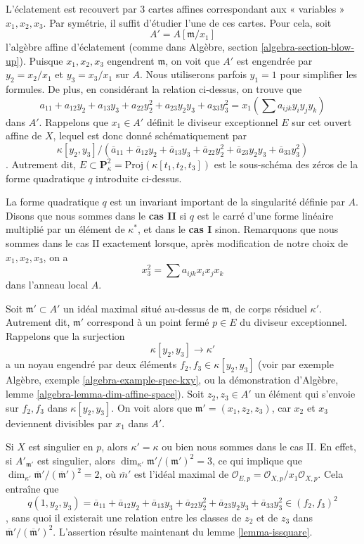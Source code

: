 \medskip\noindent L'éclatement est recouvert par $3$ cartes affines correspondant aux « variables » $x_1, x_2, x_3$. Par symétrie, il suffit d'étudier l'une de ces cartes. Pour cela, soit $$
A' = A[\mathfrak m/x_1]
$$ l'algèbre affine d'éclatement (comme dans Algèbre, section \ref{algebra-section-blow-up}). Puisque $x_1, x_2, x_3$ engendrent $\mathfrak m$, on voit que $A'$ est engendrée par $y_2 = x_2/x_1$ et $y_3 = x_3/x_1$ sur $A$. Nous utiliserons parfois $y_1 = 1$ pour simplifier les formules. De plus, en considérant la relation ci-dessus, on trouve que $$
a_{11} + a_{12} y_2 + a_{13} y_3 + a_{22} y_2^2 +
a_{23} y_2y_3 + a_{33} y_3^2 =
x_1 (\sum a_{ijk} y_iy_jy_k)
$$ dans $A'$. Rappelons que $x_1 \in A'$ définit le diviseur exceptionnel $E$ sur cet ouvert affine de $X$, lequel est donc donné schématiquement par $$
\kappa[y_2, y_3]/
(\overline{a}_{11} + \overline{a}_{12} y_2 + \overline{a}_{13} y_3 +
\overline{a}_{22} y_2^2 + \overline{a}_{23} y_2y_3 + \overline{a}_{33} y_3^2)
$$. Autrement dit, $E \subset \mathbf{P}^2_\kappa = \text{Proj}(\kappa[t_1, t_2, t_3])$ est le sous-schéma des zéros de la forme quadratique $q$ introduite ci-dessus.

\medskip\noindent La forme quadratique $q$ est un invariant important de la singularité définie par $A$. Disons que nous sommes dans le {\bf cas II} si $q$ est le carré d'une forme linéaire multiplié par un élément de $\kappa^*$, et dans le {\bf cas I} sinon. Remarquons que nous sommes dans le cas II exactement lorsque, après modification de notre choix de $x_1, x_2, x_3$, on a $$
x_3^2 = \sum a_{ijk}x_ix_jx_k
$$ dans l'anneau local $A$.

\medskip\noindent Soit $\mathfrak m' \subset A'$ un idéal maximal situé au-dessus de $\mathfrak m$, de corps résiduel $\kappa'$. Autrement dit, $\mathfrak m'$ correspond à un point fermé $p \in E$ du diviseur exceptionnel. Rappelons que la surjection $$
\kappa[y_2, y_3] \to \kappa'
$$ a un noyau engendré par deux éléments $f_2, f_3 \in \kappa[y_2, y_3]$ (voir par exemple Algèbre, exemple \ref{algebra-example-spec-kxy}, ou la démonstration d'Algèbre, lemme \ref{algebra-lemma-dim-affine-space}). Soit $z_2, z_3 \in A'$ un élément qui s'envoie sur $f_2, f_3$ dans $\kappa[y_2, y_3]$. On voit alors que $\mathfrak m' = (x_1, z_2, z_3)$, car $x_2$ et $x_3$ deviennent divisibles par $x_1$ dans $A'$.

\medskip{} Si $X$ est singulier en $p$, alors $\kappa' = \kappa$ ou bien nous sommes dans le cas II. En effet, si $A'_{\mathfrak m'}$ est singulier, alors $\dim_{\kappa'} \mathfrak m'/(\mathfrak m')^2 = 3$, ce qui implique que $\dim_{\kappa'} \overline{\mathfrak m}'/(\overline{\mathfrak m}')^2 = 2$, où $\overline{m}'$ est l'idéal maximal de $\mathcal{O}_{E, p} = \mathcal{O}_{X, p}/x_1\mathcal{O}_{X, p}$. Cela entraîne que $$
q(1, y_2, y_3) =
\overline{a}_{11} + \overline{a}_{12} y_2 + \overline{a}_{13} y_3 +
\overline{a}_{22} y_2^2 + \overline{a}_{23} y_2y_3 + \overline{a}_{33} y_3^2
\in (f_2, f_3)^2
$$, sans quoi il existerait une relation entre les classes de $z_2$ et de $z_3$ dans $\overline{\mathfrak m}'/(\overline{\mathfrak m}')^2$. L'assertion résulte maintenant du lemme \ref{lemma-issquare}.

